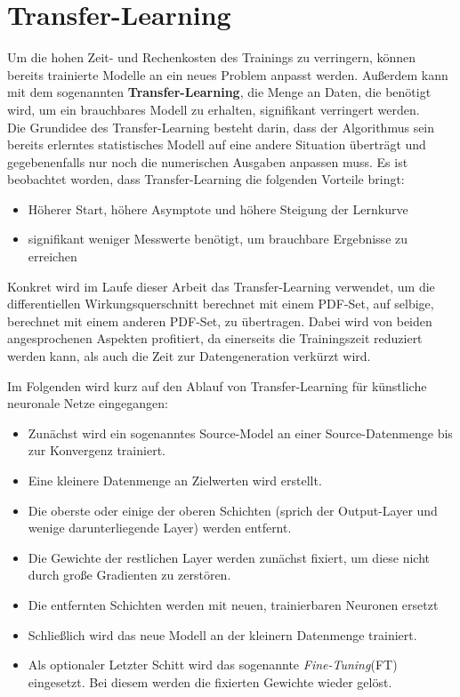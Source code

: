 \section{Transfer-Learning}
\label{transfer-learning}
Um die hohen Zeit- und Rechenkosten des Trainings zu verringern, können bereits trainierte Modelle an ein neues Problem anpasst werden. Außerdem kann mit dem sogenannten \textbf{Transfer-Learning}, die Menge an Daten, die benötigt wird, um ein brauchbares Modell zu erhalten, signifikant verringert werden. \\
Die Grundidee des Transfer-Learning besteht darin, dass der Algorithmus sein bereits erlerntes statistisches Modell auf eine andere Situation überträgt und gegebenenfalls nur noch die numerischen Ausgaben anpassen muss. Es ist beobachtet worden, dass Transfer-Learning die folgenden Vorteile bringt: %
\begin{itemize}
	\setlength\itemsep{0cm}
	\setlength{\parskip}{0cm}
	\item Höherer Start, höhere Asymptote und höhere Steigung der Lernkurve
	\item signifikant weniger Messwerte benötigt, um brauchbare Ergebnisse zu erreichen
\end{itemize}
Konkret wird im Laufe dieser Arbeit das Transfer-Learning verwendet, um die differentiellen Wirkungsquerschnitt berechnet mit einem PDF-Set, auf selbige, berechnet mit einem anderen PDF-Set, zu übertragen. Dabei wird von beiden angesprochenen Aspekten profitiert, da einerseits die Trainingszeit reduziert werden kann, als auch die Zeit zur Datengeneration verkürzt wird.

Im Folgenden wird kurz auf den Ablauf von Transfer-Learning für künstliche neuronale Netze eingegangen:
\begin{itemize}
	\setlength\itemsep{0cm}
	\setlength{\parskip}{0cm}
	\item Zunächst wird ein sogenanntes Source-Model an einer Source-Datenmenge bis zur Konvergenz trainiert. 
	\item Eine kleinere Datenmenge an Zielwerten wird erstellt.
	\item Die oberste oder einige der oberen Schichten (sprich der Output-Layer und wenige darunterliegende Layer) werden entfernt.
	\item Die Gewichte der restlichen Layer werden zunächst fixiert, um diese nicht durch große Gradienten zu zerstören.
	\item Die entfernten Schichten werden mit neuen, trainierbaren Neuronen ersetzt
	\item Schließlich wird das neue Modell an der kleinern Datenmenge trainiert.
	\item Als optionaler Letzter Schitt wird das sogenannte \textit{Fine-Tuning}(FT) eingesetzt. Bei diesem werden die fixierten Gewichte wieder gelöst.
\end{itemize}


